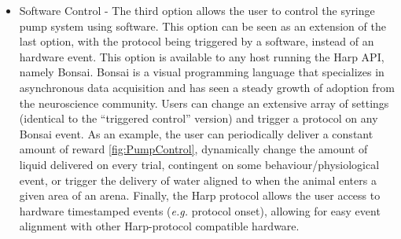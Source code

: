 \begin{itemize}
\item{Software Control} - The third option allows the user to control the syringe pump system using software. This option can be seen as an extension of the last option, with the protocol being triggered by a software, instead of an hardware event. This option is available to any host running the Harp API, namely Bonsai. Bonsai is a visual programming language that specializes in asynchronous data acquisition and has seen a steady growth of adoption from the neuroscience community. Users can change an extensive array of settings (identical to the “triggered control” version) and trigger a protocol on any Bonsai event. As an example, the user can periodically deliver a constant amount of reward \ref{fig:PumpControl}, dynamically change the amount of liquid delivered on every trial, contingent on some behaviour/physiological event, or trigger the delivery of water aligned to when the animal enters a given area of an arena.
Finally, the Harp protocol allows the user access to hardware timestamped events (\textit{e.g.} protocol onset), allowing for easy event alignment with other Harp-protocol compatible hardware.


\end{itemize}
